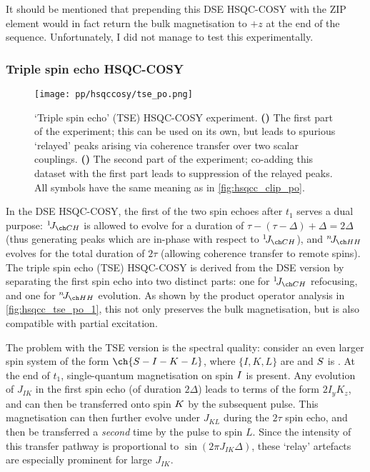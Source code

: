 It should be mentioned that prepending this DSE HSQC-COSY with the ZIP element would in fact return the bulk  magnetisation to $+z$ at the end of the sequence.
Unfortunately, I did not manage to test this experimentally.


\subsubsection{Triple spin echo HSQC-COSY}

\begin{figure}[!ht]
    \centering
    \texttt{[image: pp/hsqccosy/tse\_po.png]}%
    {\label{fig:hsqcc_tse_po_1}}%
    {\label{fig:hsqcc_tse_po_2}}%
    \caption[Triple spin echo HSQC-COSY experiment]{
        `Triple spin echo' (TSE) HSQC-COSY experiment.
        \textbf{()} The first part of the experiment; this can be used on its own, but leads to spurious `relayed' peaks arising via coherence transfer over two scalar couplings.
        \textbf{()} The second part of the experiment; co-adding this dataset with the first part leads to suppression of the relayed peaks.
        All symbols have the same meaning as in \cref{fig:hsqcc_clip_po}.
    }
    \label{fig:hsqcc_tse_po}
\end{figure}

In the DSE HSQC-COSY, the first of the two spin echoes after $t_1$ serves a dual purpose: $\oneJ{CH}$ is allowed to evolve for a duration of $\tau - (\tau - \Delta) + \Delta = 2\Delta$ (thus generating peaks which are in-phase with respect to $\oneJ{CH}$), and $\nJ{HH}$ evolves for the total duration of $2\tau$ (allowing coherence transfer to remote spins).
The triple spin echo (TSE) HSQC-COSY is derived from the DSE version by separating the first spin echo into two distinct parts: one for $\oneJ{CH}$ refocusing, and one for $\nJ{HH}$ evolution.
As shown by the product operator analysis in \cref{fig:hsqcc_tse_po_1}, this not only preserves the bulk  magnetisation, but is also compatible with partial  excitation.

The problem with the TSE version is the spectral quality: consider an even larger spin system of the form $\ch{S-I-K-L}$, where $\{I,K,L\}$ are \proton{} and $S\/$ is \carbon{}.
At the end of $t_1$, single-quantum magnetisation on spin $I\/$ is present.
Any evolution of $J_{IK}$ in the first spin echo (of duration $2\Delta$) leads to terms of the form $2I_yK_z$, and can then be transferred onto spin $K\/$ by the subsequent  pulse.
This magnetisation can then further evolve under $J_{KL}$ during the $2\tau$ spin echo, and then be transferred a \textit{second} time by the  pulse to spin $L$.
Since the intensity of this transfer pathway is proportional to $\sin(2\pi J_{IK}\Delta)$, these `relay' artefacts are especially prominent for large $J_{IK}$.

